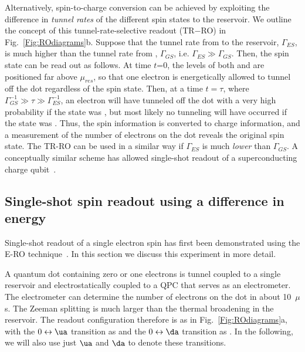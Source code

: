 \documentclass[12pt,aps,nofootinbib]{revtex4-1}
\begin{document}
Alternatively, spin-to-charge conversion can be achieved by
exploiting the difference in \textit{tunnel rates} of the
different spin states to the reservoir. We outline the concept of
this tunnel-rate-selective readout (TR$-$RO) in
Fig.~\ref{Fig:ROdiagrams}b. Suppose that the tunnel rate from
 to the reservoir, $\Gamma_{ES}$, is much higher than
the tunnel rate from , $\Gamma_{GS}$, i.e.
$\Gamma_{ES}\gg\Gamma_{GS}$. Then, the spin state can be read out
as follows. At time $t$=0, the levels of both  and
 are positioned far above $\mu_{res}$, so that one
electron is energetically allowed to tunnel off the dot regardless
of the spin state. Then, at a time $t=\tau$, where
$\Gamma_{GS}^{-1}\gg \tau \gg \Gamma_{ES}^{-1}$, an electron will
have tunneled off the dot with a very high probability if the
state was , but most likely no tunneling will have
occurred if the state was . Thus, the spin information
is converted to charge information, and a measurement of the
number of electrons on the dot reveals the original spin state.
The TR-RO can be used in a similar way if $\Gamma_{ES}$ is much
\textit{lower} than $\Gamma_{GS}$. A conceptually similar
scheme has allowed single-shot readout of a superconducting charge
qubit~\cite{Astafiev04}.

\subsection{Single-shot spin readout using a difference in energy}
\label{Subsection:ERO}

Single-shot readout of a single electron spin has first been
demonstrated using the E-RO technique~\cite{ElzermanNature2004}.
In this section we discuss this experiment in more detail.

A quantum dot containing zero or one electrons is tunnel coupled
to a single reservoir and electrostatically coupled to a QPC that
serves as an electrometer. The electrometer can determine the
number of electrons on the dot in about 10~$\mu$s. The Zeeman
splitting is much larger than the thermal broadening in the
reservoir. The readout configuration therefore is as in
Fig.~\ref{Fig:ROdiagrams}a, with the $0\leftrightarrow \ua$
transition as   and the $0\leftrightarrow \da$
transition as . In the following, we will also use just
$\ua$ and $\da$ to denote these transitions.
\end{document}
